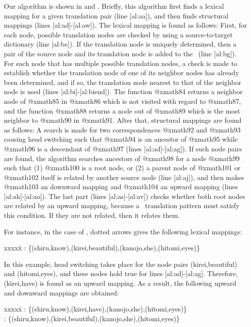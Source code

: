 Our algorithm is shown in  and . 
Briefly, this algorithm first finds a lexical mapping for a given translation
pair (line [al:aa]), and then finds structural mappings (lines
[al:ad]-[al:aw]). The lexical mapping is found as follows: First, for
each node, possible translation nodes are checked by using a source-to-target
dictionary (line [al:be]). If the translation node is uniquely determined,
then a pair of the source node and its translation node is added to the \ML\
(line [al:bg]). For each node that has multiple possible translation
nodes, a check is made to establish whether the translation node of one of its
neighbor nodes has already been determined, and if so, the translation node
nearest to that of the neighbor node is used (lines
[al:bi]-[al:biend]). The function @xmath84
returns a neighbor node of @xmath85 in @xmath86 which is not visited with regard to
@xmath87, and the function @xmath88 returns a node out
of @xmath89 which is the most neighbor to @xmath90 in @xmath91.  After that,
structural mappings are found as follows: A search is made for two
correspondences @xmath92 and @xmath93 causing head switching such that
@xmath94 is an ancestor of @xmath95 while @xmath96 is a descendant of @xmath97 (lines
[al:ad]-[al:ag]). If such node pairs are found, the algorithm searches
ancestors of @xmath98 for a node @xmath99 such that (1) @xmath100 is a root node, or (2)
a parent node of @xmath101 or @xmath102 itself is related by another source node (line
[al:aj]), and then makes @xmath103 an downward mapping and @xmath104
an upward mapping (lines
[al:ah]-[al:ao]). The last part (lines [al:as]-[al:av]) checks
whether both root nodes are related by an upward mapping, because a \SimTran\
translation pattern must satisfy this condition. If they are not related, then
it relates them.

For instance, in the case of , dotted arrows
gives the following lexical mappings: 
\begin{tabbing}
xxxxx\=\+\kill
\ML: \{(shiru,know),(kirei,beautiful),(kanojo,she),(hitomi,eyes)\} 
\end{tabbing}
In this example, head switching takes place for the node pairs
(kirei,beautiful) and (hitomi,eyes), and these nodes hold true for lines
[al:ad]-[al:ag]. Therefore, (kirei,have) is found as an upward
mapping. As a result, the following upward and downward mappings are obtained:
\begin{tabbing}
xxxxx\=\+\kill
\Mup: \{(shiru,know),(kirei,have),(kanojo,she),(hitomi,eyes)\} \\
\Mdw: \{(shiru,know),(kirei,beautiful),(kanojo,she),(hitomi,eyes)\} 
\end{tabbing}

